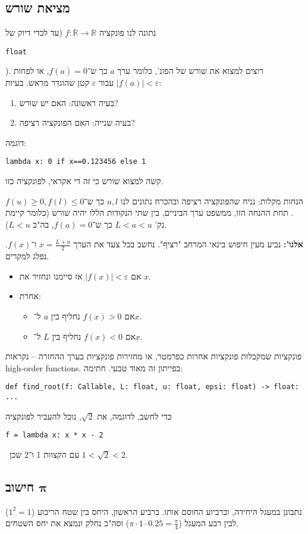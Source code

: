 \documentclass[]{article}
\newcommand\en[1] {\begin{otherlanguage}{english}#1\end{otherlanguage}}
\newcommand\sen   {\begin{otherlanguage}{english}}
\newcommand\she   {\end{otherlanguage}}
\newcommand\ttt[1]{\en{\footnotesize\texttt{#1}\normalsize}}
\newcommand\R     {\mathbb{R}}
\newcommand\vepsi {\varepsilon}
\begin{document}
	\subsection{מציאת שורש}
	נתונה לנו פונקציה $f \colon \R\to \R$ (עד לכדי דיוק של \ttt{float}). רוצים למצוא את שורש של הפונ', כלומר ערך $a$ כך ש־$f(a) = 0$, או לפחות $|f(a)| < \vepsi$ עבור $\vepsi$ קטן שהוגדר מראש. בעיות: 
	
	\begin{enumerate}
		\item בעיה ראשונה: האם יש שורש? 
		\item בעיה שנייה: האם הפונקציה רציפה? 
	\end{enumerate}
	
	דוגמה: 
	\sen
	\begin{lstlisting}
lambda x: 0 if x==0.123456 else 1\end{lstlisting}
	\she
	קשה למצוא שורש כי זה די אקראי, לפונקציה כזו.
	
	הנחות מקלות: נניח שהפונקציה רציפה ובהכרח נתונים לנו $u, l$ כך ש־$f(u) \ge 0, f(l) \le 0$. תחת ההנחה הזו, ממשפט ערך הביניים, בין שתי הנקודות הללו יהיה שורש (כלומר קיימת נק' $L < a < u$ כך ש־$f(a) = 0$, בה"כ $L < u$).
	
	\textbf{אלגו': }נביע מעין חיפוש בינאי המרחב "רציף". נחשב בכל צעד את הערך $x = \frac{L + u}{2}$ ו־$f(x)$. נפלג למקרים. 
	\begin{itemize}
		\item אם $|f(x)| < \vepsi$ אז סיימנו ונחזיר את $x$. 
		\item אחרת: 
		\begin{itemize}
			\item אם $f(x) > 0$ נחליף בין $u$ ל־$x$. 
			\item אם $f(x) < 0$ נחליף בין $L$ ל־$x$. 
		\end{itemize}
	\end{itemize}
	
	פונקציות שמקבלות פונקציות אחרות כפרמטר, או מחזירות פונקציות בערך ההחזרה – נקראות high-order functions. בפייתון זה מאוד טבעי. חתימה: 
\sen
	\begin{lstlisting}
def find_root(f: Callable, L: float, u: float, epsi: float) -> float: ...
\end{lstlisting}
\she
	כדי לחשב, לדוגמה, את $\sqrt2$, נוכל להעביר לפונקציה \ttt{f = lambda x: x * x - 2} \ עם הקצוות 1 ו־2 שכן $1 < \sqrt2 < 2$.
	
	\subsection{חישוב $\bm{\pi}$}
	נתבונן במעגל היחידה, וברביוע החוסם אותו. ברביע הראשון, היחס בין שטח הריבוע ($1^2 = 1$) לבין רבע המעגל ($\pi \cdot 1 \cdot 0.25 = \frac{\pi}{4}$) וסה"כ נחלק ונמצא את יחס השטחים.  
	
\end{document}
